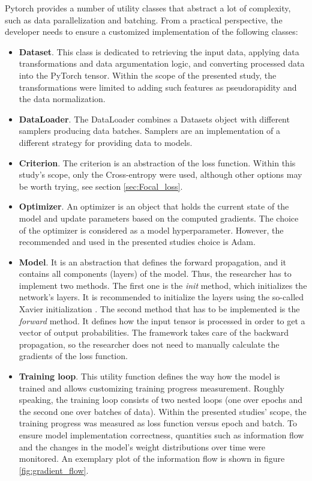 Pytorch provides a number of utility classes that abstract a lot of complexity, such as data parallelization and batching. From a practical perspective, the developer needs to ensure a customized implementation of the following classes: 

\begin{itemize}
\item \textbf{Dataset}. This class is dedicated to retrieving the input data,  applying data transformations and data argumentation logic, and converting processed data into the PyTorch tensor.  Within the scope of the presented study, the transformations were limited to adding such features as pseudorapidity and the data normalization. 
 \item \textbf{DataLoader}. The DataLoader combines a Datasets object with different samplers producing data batches. Samplers are an implementation of a different strategy for providing data to models. 
\item \textbf{Criterion}. The criterion is an abstraction of the loss function. Within this study's scope, only the Cross-entropy were used, although other options may be worth trying, see section \ref{sec:Focal_loss}. 
\item \textbf{Optimizer}. An optimizer is an object that holds the current state of the model and update parameters based on the computed gradients. The choice of the optimizer is considered as a model hyperparameter. However, the recommended and used in the presented studies choice is Adam. 
\item \textbf{Model}. It is an abstraction that defines the forward propagation, and it contains all components (layers) of the model.
Thus, the researcher has to implement two methods. The first one is the \textit{init} method, which initializes the network's layers. It is recommended to initialize the layers using the so-called Xavier initialization \cite{xavier}.  The second method that has to be implemented is the \textit{forward} method. It defines how the input tensor is processed in order to get a vector of output probabilities. The framework takes care of the backward propagation, so the researcher does not need to manually calculate the gradients of the loss function. 
\item \textbf{Training loop}. This utility function defines the way how the model is trained and allows customizing training progress measurement. 
Roughly speaking, the training loop consists of two nested loops (one over epochs and the second one over batches of data). 
Within the presented studies' scope, the training progress was measured as loss function versus epoch and batch. To ensure model implementation correctness, quantities such as information flow and the changes in the model's weight distributions over time were monitored. An exemplary plot of the information flow is shown in figure \ref{fig:gradient_flow}.
\end{itemize}

